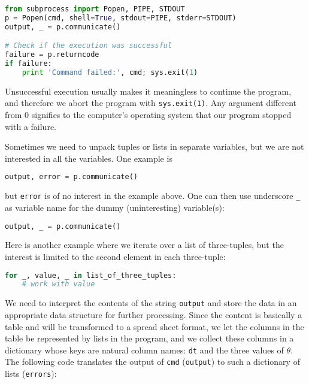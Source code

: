 \documentclass[graybox,sectrefs,envcountresetchap,open=right,final]{svmonodo}
\newenvironment{notice_mdfboxadmon}[1][]{
\begin{notice_mdfboxmdframed}[frametitle=#1]
}
{
\end{notice_mdfboxmdframed}
}
\begin{document}
\begin{lstlisting}[language=Python,style=blue1_bluegreen]
from subprocess import Popen, PIPE, STDOUT
p = Popen(cmd, shell=True, stdout=PIPE, stderr=STDOUT)
output, _ = p.communicate()

# Check if the execution was successful
failure = p.returncode
if failure:
    print 'Command failed:', cmd; sys.exit(1)
\end{lstlisting}
Unsuccessful execution usually makes it meaningless to continue
the program, and therefore we abort the program with \texttt{sys.exit(1)}.
Any argument different from 0 signifies to the computer's operating system
that our program stopped with a failure.


\begin{notice_mdfboxadmon}
Sometimes we need to unpack tuples or lists in separate variables,
but we are not interested in all the variables. One example is

\begin{lstlisting}[language=Python,style=blue1_bluegreen]
output, error = p.communicate()
\end{lstlisting}
but \texttt{error} is of no interest in the example above.
One can then use underscore \Verb!_! as variable name for the dummy
(uninteresting) variable(s):

\begin{lstlisting}[language=Python,style=blue1_bluegreen]
output, _ = p.communicate()
\end{lstlisting}
Here is another example where we iterate over a list of three-tuples,
but the interest is limited to the second element in each three-tuple:

\begin{lstlisting}[language=Python,style=blue1_bluegreen]
for _, value, _ in list_of_three_tuples:
    # work with value
\end{lstlisting}
\end{notice_mdfboxadmon}



We need to interpret the contents of the string
\texttt{output} and store
the data in an appropriate data structure for further processing.
Since the content is basically a table and will be transformed to
a spread sheet format, we let the columns in the table be represented
by lists in the program,
and we collect these columns in a dictionary whose keys are natural
column names: \texttt{dt} and the three values of $\theta$.
The following code translates the output of \texttt{cmd} (\texttt{output})
to such a dictionary of lists (\texttt{errors}):
\end{document}
